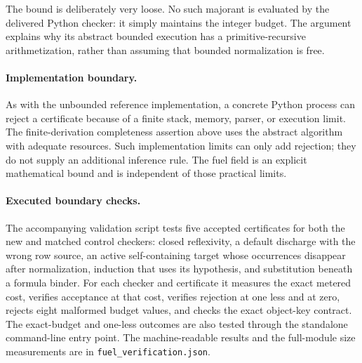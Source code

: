 The bound is deliberately very loose. No such majorant is evaluated by the
delivered Python checker: it simply maintains the integer budget. The
argument explains why its abstract bounded execution has a
primitive-recursive arithmetization, rather than assuming that bounded
normalization is free.

\paragraph{Implementation boundary.}
As with the unbounded reference implementation, a concrete Python process
can reject a certificate because of a finite stack, memory, parser, or
execution limit. The finite-derivation completeness assertion above uses
the abstract algorithm with adequate resources. Such implementation limits
can only add rejection; they do not supply an additional inference rule.
The fuel field is an explicit mathematical bound and is independent of
those practical limits.

\paragraph{Executed boundary checks.}
The accompanying validation script tests five accepted certificates for
both the new and matched control checkers: closed reflexivity, a default
discharge with the wrong row source, an active self-containing target whose
occurrences disappear after normalization, induction that uses its
hypothesis, and substitution beneath a formula binder. For each checker
and certificate it measures the exact metered cost, verifies acceptance at
that cost, verifies rejection at one less and at zero, rejects eight
malformed budget values, and checks the exact object-key contract. The
exact-budget and one-less outcomes are also tested through the standalone
command-line entry point. The machine-readable results and the full-module
size measurements are in \texttt{fuel\_verification.json}.
